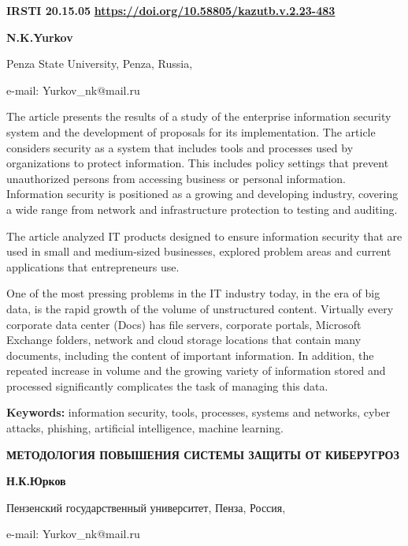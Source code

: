\newpage
{\bfseries IRSTI 20.15.05}
\hfill {\bfseries \href{https://doi.org/10.58805/kazutb.v.2.23-483}{https://doi.org/10.58805/kazutb.v.2.23-483}}


\begin{center}
{\bfseries N.K.Yurkov}

Penza State University, Penza, Russia,

e-mail: Yurkov\_nk@mail.ru
\end{center}

The article presents the results of a study of the enterprise
information security system and the development of proposals for its
implementation. The article considers security as a system that includes
tools and processes used by organizations to protect information. This
includes policy settings that prevent unauthorized persons from
accessing business or personal information. Information security is
positioned as a growing and developing industry, covering a wide range
from network and infrastructure protection to testing and auditing.

The article analyzed IT products designed to ensure information security
that are used in small and medium-sized businesses, explored problem
areas and current applications that entrepreneurs use.

One of the most pressing problems in the IT industry today, in the era
of big data, is the rapid growth of the volume of unstructured content.
Virtually every corporate data center (Docs) has file servers, corporate
portals, Microsoft Exchange folders, network and cloud storage locations
that contain many documents, including the content of important
information. In addition, the repeated increase in volume and the
growing variety of information stored and processed significantly
complicates the task of managing this data.

{\bfseries Keywords:} information security, tools, processes, systems and
networks, cyber attacks, phishing, artificial intelligence, machine
learning.

\begin{center}
{\large\bfseries МЕТОДОЛОГИЯ ПОВЫШЕНИЯ СИСТЕМЫ ЗАЩИТЫ ОТ КИБЕРУГРОЗ}

{\bfseries Н.К.Юрков}

Пензенский государственный университет, Пенза, Россия,

e-mail: Yurkov\_nk@mail.ru
\end{center}

